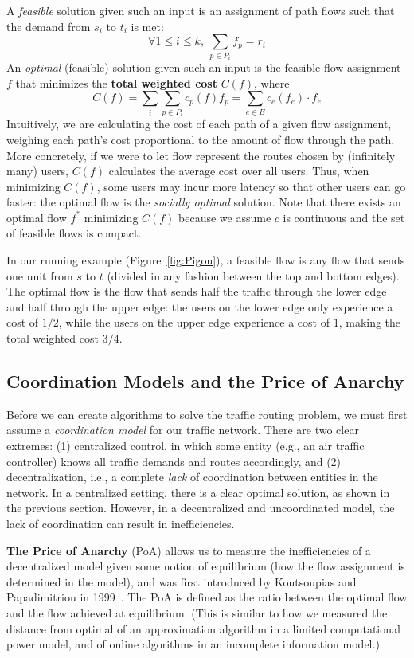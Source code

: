 \documentclass[acmlarge]{acmart}
\begin{document}
A \emph{feasible} solution given such an input is an assignment of path flows such that the demand from $s_i$ to $t_i$ is met:
$$\forall 1 \le i \le k,~\sum_{p\in P_i} f_p = r_i$$
%
An \emph{optimal} (feasible) solution given such an input is the feasible flow assignment $f$ that minimizes the \textbf{total weighted cost} $C(f)$, where
$$C(f) = \sum_i\sum_{p\in P_i}c_p(f)f_p = \sum_{e\in E} c_e(f_e)\cdot f_e$$
Intuitively, we are calculating the cost of each path of a given flow assignment, weighing 
each path's cost proportional to the amount of flow through the path. More concretely,
if we were to let flow represent the routes chosen by (infinitely many) users, $C(f)$ calculates the average cost over all users. Thus, when minimizing $C(f)$, some users may incur 
more latency so that other users can go faster: the optimal flow is the \emph{socially optimal} solution.
Note that there exists an optimal flow $f^*$ minimizing $C(f)$ because we assume $c$ is continuous and the set of feasible flows is compact.

In our running example (Figure~\ref{fig:Pigou}), a feasible flow is any flow that sends one unit from $s$ to $t$ (divided in any fashion between the top and bottom edges).
The optimal flow is the flow that sends half the traffic through the lower edge and half through the upper edge: the users on the lower edge only experience a cost of $1/2$, while the users on the upper edge experience a cost of $1$, making the total weighted cost $3/4$.

\subsection{Coordination Models and the Price of Anarchy}
Before we can create algorithms to solve the traffic routing problem, we must first assume a \emph{coordination model} for our traffic network.
There are two clear extremes: (1) centralized control, in which some entity (e.g., an air traffic controller) knows all traffic demands and routes accordingly, and
(2) decentralization, i.e., a complete \emph{lack} of coordination between
entities in the network.
In a centralized setting, there is a clear optimal solution, as shown in the previous section.
However, in a decentralized and uncoordinated model, the lack of coordination can result in
inefficiencies. 

\medskip
\textbf{The Price of Anarchy} (PoA) allows us to measure the inefficiencies of a decentralized model given some notion of equilibrium (how the flow assignment is determined in the model), and was first introduced by Koutsoupias and Papadimitriou in 1999~\cite{poa}. 
The PoA is defined as the ratio between the optimal flow and the flow achieved
at equilibrium.
(This is similar to how we measured the distance from optimal of an approximation algorithm in a limited computational power model, and of online algorithms in an incomplete information model.)
\end{document}
